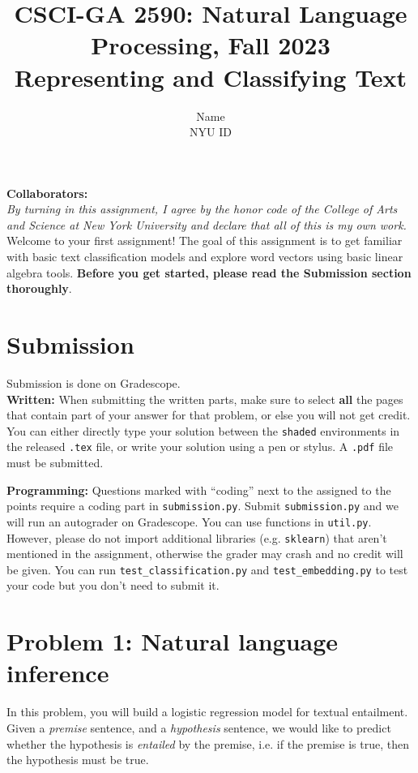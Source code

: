 \documentclass{article}
\title{\textbf{CSCI-GA 2590: Natural Language Processing, Fall 2023} \\Representing and Classifying Text}
\author{Name \\
NYU ID}
\date{}
\theoremstyle{case}
\theoremstyle{definition}
\begin{document}
\maketitle

\textbf{Collaborators:} \\
\textit{By turning in this assignment, I agree by the honor code of the College of Arts and Science at New York University and declare
that all of this is my own work.} \\

Welcome to your first assignment! The goal of this assignment is to get familiar with basic text classification models and explore word vectors using basic linear algebra tools.
\textbf{Before you get started, please read the Submission section thoroughly}.

\section*{Submission}
Submission is done on Gradescope. \\

\textbf{Written:} When submitting the written parts, make sure to select \textbf{all} the pages that contain part of your answer for that problem, or else you will not get credit.
You can either directly type your solution between the \texttt{shaded} environments in the released \texttt{.tex} file,
or write your solution using a pen or stylus. 
A \texttt{.pdf} file must be submitted.

\textbf{Programming:} Questions marked with ``coding'' next to the assigned to the points require a coding part in \texttt{submission.py}.
Submit \texttt{submission.py} and we will run an autograder on Gradescope. You can use functions in \texttt{util.py}. However, please do not import additional libraries (e.g. \texttt{sklearn}) that aren't mentioned in the assignment, otherwise the grader may crash and no credit will be given.
You can run \texttt{test\_classification.py} and \texttt{test\_embedding.py} to test your code but you don't need to submit it.


\section*{Problem 1: Natural language inference}
In this problem, you will build a logistic regression model for textual entailment.
Given a \textit{premise} sentence,
and a \textit{hypothesis} sentence,
we would like to predict whether the hypothesis is \textit{entailed} by the premise,
i.e. if the premise is true, then the hypothesis must be true.
\end{document}
